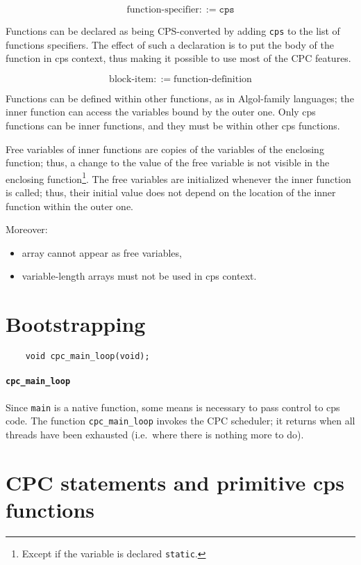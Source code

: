 \documentclass[a4paper]{report}
\begin{document}
\[ \mbox{function-specifier} ::= \mathtt{cps} \]

Functions can be declared as being CPS-converted by adding {\tt cps}
to the list of functions specifiers.  The effect of such a declaration
is to put the body of the function in cps context, thus making it
possible to use most of the CPC features.

\[ \mbox{block-item} ::= \mbox{function-definition} \]

Functions can be defined within other functions, as in Algol-family
languages; the inner function can access the variables bound by the
outer one.  Only cps functions can be inner functions, and they must
be within other cps functions.

Free variables of inner functions are copies of the variables of the
enclosing function; thus, a change to the value of the free variable
is not visible in the enclosing function\footnote{Except if the variable
is declared {\tt static}.}.  The free variables are initialized whenever
the inner function is called; thus, their initial value does not depend
on the location of the inner function within the outer one.

Moreover:
\begin{itemize}
  \item array cannot appear as free variables,
  \item variable-length arrays must not be used in cps context.
\end{itemize}

\section{Bootstrapping} \label{sec:bootstrapping}

\begin{verbatim}
    void cpc_main_loop(void);
\end{verbatim}

\paragraph{\tt cpc\_main\_loop} Since \verb|main| is a native
function, some means is necessary to pass control to cps code.  The
function \verb|cpc_main_loop| invokes the CPC scheduler; it returns
when all threads have been exhausted (i.e.\ where there is
nothing more to do).

\section{CPC statements and primitive cps functions}
\end{document}
